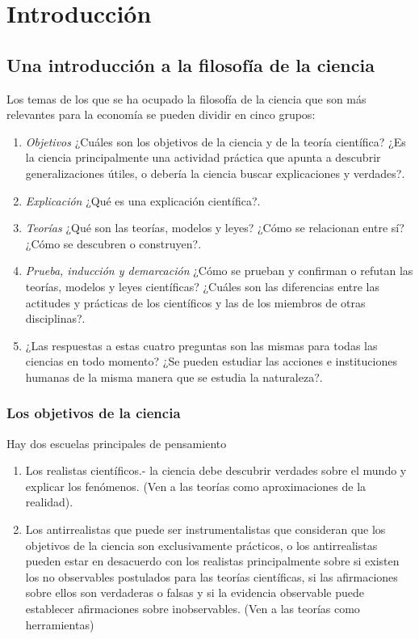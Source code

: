 

\chapter*{Introducción}

\section{Una introducción a la filosofía de la ciencia}
Los temas de los que se ha ocupado la filosofía de la ciencia que son más relevantes para la economía se pueden dividir en cinco grupos:

\begin{enumerate}[1.]
    \item \textit{Objetivos} ¿Cuáles son los objetivos de la ciencia y de la teoría científica? ¿Es la ciencia principalmente una actividad práctica que apunta a descubrir generalizaciones útiles, o debería la ciencia buscar explicaciones y verdades?.
    \item \textit{Explicación} ¿Qué es una explicación científica?.
    \item \textit{Teorías} ¿Qué son las teorías, modelos y leyes? ¿Cómo se relacionan entre sí? ¿Cómo se descubren o construyen?.
    \item \textit{Prueba, inducción y demarcación} ¿Cómo se prueban y confirman o refutan las teorías, modelos y leyes científicas? ¿Cuáles son las diferencias entre las actitudes y prácticas de los científicos y las de los miembros de otras disciplinas?.
    \item ¿Las respuestas a estas cuatro preguntas son las mismas para todas las ciencias en todo momento? ¿Se pueden estudiar las acciones e instituciones humanas de la misma manera que se estudia la naturaleza?.
\end{enumerate}

\subsection{Los objetivos de la ciencia}
Hay dos escuelas principales de pensamiento

\begin{enumerate}[1.]
    \item Los realistas científicos.- la ciencia debe descubrir verdades sobre el mundo y explicar los fenómenos. (Ven a las teorías como aproximaciones de la realidad).
    \item Los antirrealistas que puede ser instrumentalistas que consideran que los objetivos de la ciencia son exclusivamente prácticos, o los antirrealistas pueden estar en desacuerdo con los realistas principalmente sobre si existen los no observables postulados para las teorías científicas, si las afirmaciones sobre ellos son verdaderas o falsas y si la evidencia observable puede establecer afirmaciones sobre inobservables. (Ven a las teorías como herramientas)
\end{enumerate}

